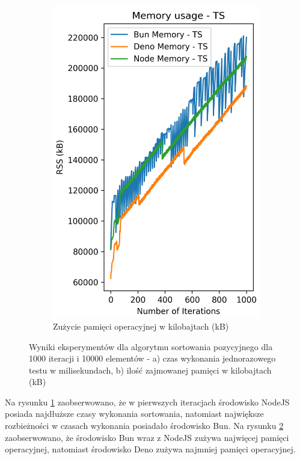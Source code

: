 \begin{figure}[H]
\begin{subfigure}[b]{0.44\textwidth}
    \label{fig:radix_sorting_e4_ts_time}
  \end{subfigure}
  \begin{subfigure}[b]{0.44\textwidth}
    \centering
    \includegraphics[width=\textwidth]{Figures/sorting/sorting_radix_1000_10000_ts_memory.png}
    \caption{Zużycie pamięci operacyjnej w kilobajtach (kB)}
    \label{fig:radix_sorting_e4_ts_memory}
  \end{subfigure}
  \hfill
  \caption{Wyniki eksperymentów dla algorytmu sortowania pozycyjnego dla 1000 iteracji i 10000 elementów - a) czas wykonania jednorazowego testu w milisekundach, b) ilość zajmowanej pamięci w kilobajtach (kB)}
  \label{fig:radix_sorting_e4_ts}
\end{figure}

Na rysunku \ref{fig:radix_sorting_e4_ts_time} zaobserwowano, że w pierwszych iteracjach środowisko NodeJS posiada najdłuższe czasy wykonania sortowania, natomiast największe rozbieżności w czasach wykonania posiadało środowisko Bun. Na rysunku \ref{fig:radix_sorting_e4_ts_memory} zaobserwowano, że środowisko Bun wraz z NodeJS zużywa najwięcej pamięci operacyjnej, natomiast środowisko Deno zużywa najmniej pamięci operacyjnej.

